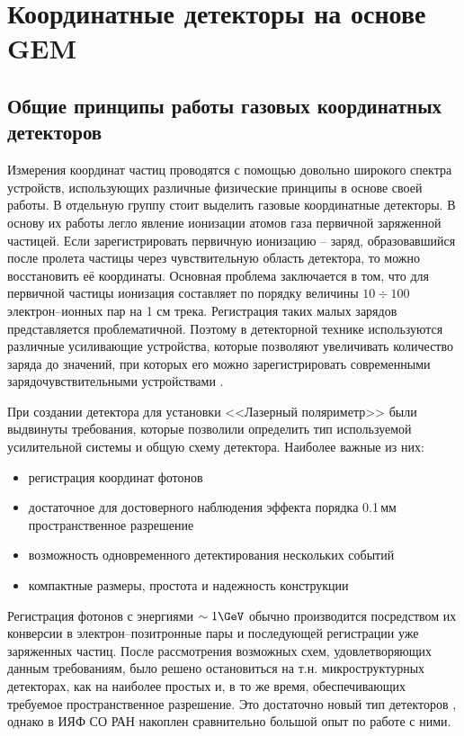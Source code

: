 \chapter{Координатные детекторы на основе GEM}
\label{sec:coor_GEM}
\section{Общие принципы работы газовых координатных детекторов}
Измерения координат частиц проводятся с помощью довольно широкого спектра устройств, использующих различные физические принципы в основе своей работы. В отдельную группу стоит выделить газовые координатные детекторы. В основу их работы легло явление ионизации атомов газа первичной заряженной частицей. Если зарегистрировать первичную ионизацию -- заряд, образовавшийся после пролета частицы через чувствительную область детектора, то можно восстановить её координаты. Основная проблема заключается в том, что для первичной частицы ионизация составляет по порядку величины $10 \div 100$ электрон--ионных пар на 1 см трека. Регистрация таких малых зарядов представляется проблематичной. Поэтому в детекторной технике используются различные усиливающие устройства, которые позволяют увеличивать количество заряда до значений, при которых его можно зарегистрировать современными зарядочувствительными устройствами \cite{grupen}.
\par При создании детектора для установки <<Лазерный поляриметр>> были выдвинуты требования, которые позволили определить тип используемой усилительной системы и общую схему детектора. Наиболее важные из них: 
\begin{itemize}
	\item регистрация координат фотонов
	\item достаточное для достоверного наблюдения эффекта порядка 0.1\,мм пространственное разрешение 
	\item возможность одновременного детектирования нескольких событий 
	\item компактные размеры, простота и надежность конструкции
\end{itemize}
Регистрация фотонов с энергиями $\sim1\GeV$ обычно производится посредством их конверсии в электрон--позитронные пары и последующей регистрации уже заряженных частиц. После рассмотрения возможных схем, удовлетворяющих данным требованиям, было решено остановиться на т.н. микроструктурных детекторах, как на наиболее простых и, в то же время, обеспечивающих требуемое пространственное разрешение. Это достаточно новый тип детекторов \cite{sauli}, однако в ИЯФ СО РАН накоплен сравнительно большой опыт по работе с ними.
